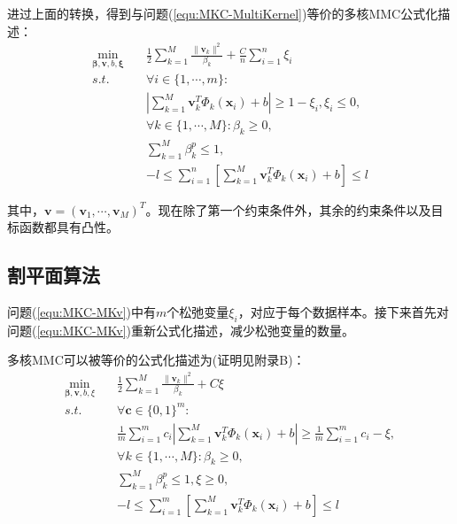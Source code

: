 进过上面的转换，得到与问题(\ref{equ:MKC-MultiKernel})等价的多核MMC公式化描述：
\begin{equation}
\begin{split}
\min_{\mathbf{\beta},\mathbf{v},b,\mathbf{\xi}} \quad & \frac{1}{2}\sum^M_{k=1}\frac{\|\mathbf{v}_k\|^2}{\beta_k}+\frac{C}{n}\sum^n_{i=1}\xi_i\\
s.t. \quad & \forall i \in \{1,\cdots,m\}:   \\
& \left |\sum^M_{k=1}\mathbf{v}_k^T\Phi_k(\mathbf{x}_i)+b\right | \ge 1-\xi_i,\xi_i \le 0,   \\
& \forall k \in \{1,\cdots,M\}:\beta_k \ge 0,   \\
& \sum^M_{k=1}\beta_k^p \le 1,   \\
& -l \le \sum^n_{i=1}\left [ \sum^M_{k=1}\mathbf{v}_k^T\Phi_k(\mathbf{x}_i)+b\right ] \le l  
\label{equ:MKC-MKv}
\end{split}
\end{equation}

其中，$\mathbf{v}=(\mathbf{v}_1,\cdots,\mathbf{v}_M)^T$。现在除了第一个约束条件外，其余的约束条件以及目标函数都具有凸性。

\subsection{割平面算法}
问题(\ref{equ:MKC-MKv})中有$m$个松弛变量$\xi_i$，对应于每个数据样本。接下来首先对问题(\ref{equ:MKC-MKv})重新公式化描述，减少松弛变量的数量。
\begin{theorem} 
\rm 多核MMC可以被等价的公式化描述为(证明见附录B)：
\begin{align}
\min_{\mathbf{\beta},\mathbf{v},b,\xi} \quad & \frac{1}{2}\sum^M_{k=1}\frac{\|\mathbf{v}_k\|^2}{\beta_k}+C\xi  \label{equ:MKC-gpm} \\
\nonumber s.t.  \quad & \forall \mathbf{c}\in \{0,1\}^m:   \\
& \frac{1}{m}\sum^m_{i=1}c_i\left |\sum^M_{k=1}\mathbf{v}_k^T\Phi_k(\mathbf{x}_i)+b\right | \ge \frac{1}{m}\sum^m_{i=1}c_i-\xi,  \label{equ:MKC-gpmCon}\\
\nonumber & \forall k \in \{1,\cdots,M\}:\beta_k \ge 0,   \\
\nonumber & \sum^M_{k=1}\beta_k^p \le 1, \xi \ge 0,  \\
\nonumber & -l \le \sum^m_{i=1}\left[\sum^M_{k=1}\mathbf{v}_k^T\Phi_k(\mathbf{x}_i)+b\right] \le l 
\end{align}
\label{theorem:MKC1}
\end{theorem}

